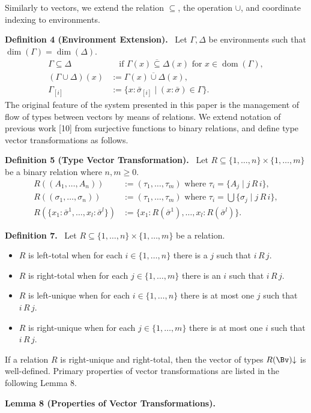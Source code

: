 \documentclass[10pt,a4paper]{article}
\newcommand{\sv}{\bar\sigma}\newcommand{\tv}{\bar\tau}
\newcommand{\vsub}{\mathrel{\overline{\subseteq}}}
\newcommand{\vcup}{\mathbin{\overline{\cup}}}
\newcommand{\dimn}{\operatorname{dim}}
\newcommand{\dom}{\operatorname{dom}}
\newcommand{\orig}[2]{\par\medskip\noindent\textbf{#1 #2.}\ }
\begin{document}
Similarly to vectors, we extend the relation $\subseteq$, the operation $\cup$, and coordinate indexing to environments.
\orig{Definition}{4 (Environment Extension)}
Let $\Gamma,\Delta$ be environments such that $\dimn(\Gamma)=\dimn(\Delta)$.
\begin{align*}
\Gamma\subseteq\Delta&\quad\text{if }\Gamma(x)\vsub\Delta(x)\text{ for }x\in\dom(\Gamma),\\
(\Gamma\cup\Delta)(x)&:=\Gamma(x)\vcup\Delta(x),\\
\Gamma_{[i]}&:=\{x:\sv_{[i]}\mid(x:\sv)\in\Gamma\}.
\end{align*}
The original feature of the system presented in this paper is the management of flow of types between vectors by means of relations. We extend notation of previous work [10] from surjective functions to binary relations, and define type vector transformations as follows.
\orig{Definition}{5 (Type Vector Transformation)}
Let $R\subseteq\{1,\ldots,n\}\times\{1,\ldots,m\}$ be a binary relation where $n,m\geq0$.
\begin{align*}
R((A_1,\ldots,A_n))&:=(\tau_1,\ldots,\tau_m)\text{ where }\tau_i=\{A_j\mid j\,R\,i\},\\
R((\sigma_1,\ldots,\sigma_n))&:=(\tau_1,\ldots,\tau_m)\text{ where }\tau_i=\bigcup\{\sigma_j\mid j\,R\,i\},\\
R(\{x_1:\sv^1,\ldots,x_l:\sv^l\})&:=\{x_1:R(\sv^1),\ldots,x_l:R(\sv^l)\}.
\end{align*}
\orig{Definition}{7}
Let $R\subseteq\{1,\ldots,n\}\times\{1,\ldots,m\}$ be a relation.
\begin{itemize}
\item $R$ is left-total when for each $i\in\{1,\ldots,n\}$ there is a $j$ such that $i\,R\,j$.
\item $R$ is right-total when for each $j\in\{1,\ldots,m\}$ there is an $i$ such that $i\,R\,j$.
\item $R$ is left-unique when for each $i\in\{1,\ldots,n\}$ there is at most one $j$ such that $i\,R\,j$.
\item $R$ is right-unique when for each $j\in\{1,\ldots,m\}$ there is at most one $i$ such that $i\,R\,j$.
\end{itemize}
If a relation $R$ is right-unique and right-total, then the vector of types $R(\Bv)\mathord\downarrow$ is well-defined. Primary properties of vector transformations are listed in the following Lemma 8.
\orig{Lemma}{8 (Properties of Vector Transformations)}
\end{document}
